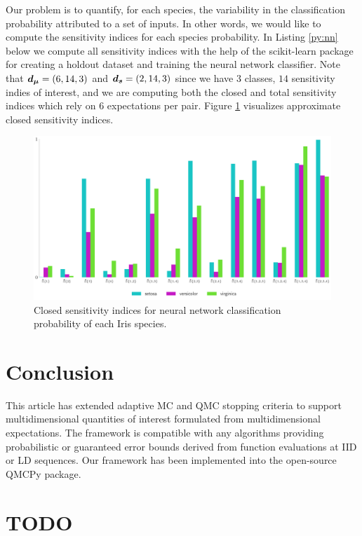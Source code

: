 \documentclass{article}[12pt]
\begin{document}
Our problem is to quantify, for each species, the variability in the classification probability attributed to a set of inputs. In other words, we would like to compute the sensitivity indices for each species probability. In Listing \ref{py:nn} below we compute all sensitivity indices with the help of the scikit-learn package \cite{scikit-learn} for creating a holdout dataset and training the neural network classifier. Note that $\boldsymbol{d}_{\boldsymbol{\mu}} = (6,14,3)$ and $\boldsymbol{d}_{\boldsymbol{s}} = (2,14,3)$ since we have $3$ classes, $14$ sensitivity indies of interest, and we are computing both the closed and total sensitivity indices which rely on $6$ expectations per pair. Figure \ref{fig:nn_si} visualizes approximate closed sensitivity indices. 



\begin{figure}[H]
    \centering
    \includegraphics[width=.8\textwidth]{figs/nn_si.pdf}
    \caption{Closed sensitivity indices for neural network classification probability of each Iris species.}
    \label{fig:nn_si}
\end{figure}

\section{Conclusion}

This article has extended adaptive MC and QMC stopping criteria to support multidimensional quantities of interest formulated from multidimensional expectations. The framework is compatible with any algorithms providing probabilistic or guaranteed error bounds derived from function evaluations at IID or LD sequences. Our framework has been implemented into the open-source QMCPy package. 

\printbibliography

\section*{TODO}
\end{document}
